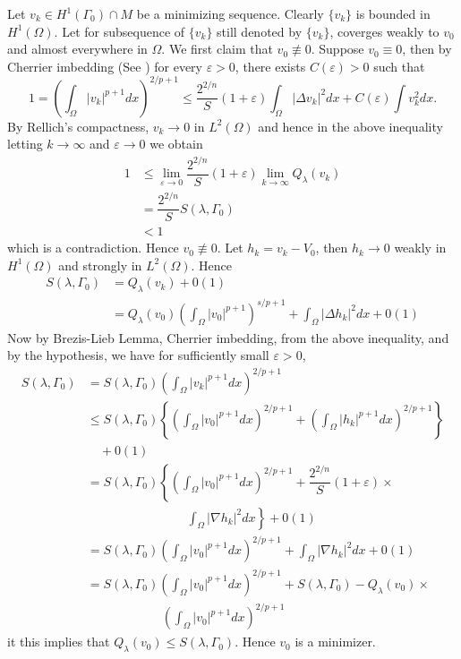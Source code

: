 \begin{sketch of the proof}
\begin{enumerate}[\rm \bf Step 1.]
Let $v_{k} \in H^{1}(\Gamma_{0})\cap M$ be a minimizing sequence. Clearly $\{v_{k}\}$ is bounded in $H^{1}(\Omega)$. Let for subsequence of $\{v_{k}\}$ still denoted by $\{v_{k}\}$, coverges weakly to $v_{0}$ and almost everywhere in $\Omega$. We first claim that $v_{0}\nequiv 0$. Suppose $v_{0}\equiv 0$, then by Cherrier imbedding (See \cite{art2-key8}) for every $\varepsilon > 0$, there exists $C(\varepsilon) > 0$ such that
 $$
 1 = \left(\int_{\Omega}|v_{k}|^{p+1}dx\right)^{2/p+1} \leq \dfrac{2^{2/n}}{S}(1+\varepsilon) \int_{\Omega}|\Delta v_{k}|^{2}dx + C(\varepsilon)\int v_{k}^{2}dx.
$$
By Rellich's compactness, $v_{k} \rightarrow 0$ in $L^{2}(\Omega)$ and hence in the above inequality letting $k \rightarrow \infty$ and $\varepsilon \rightarrow 0$ we obtain
\begin{align*}
1 &\leq \lim_{\varepsilon \rightarrow 0}\dfrac{2^{2/n}}{S}(1+\varepsilon) \lim_{k \rightarrow \infty} Q_{\lambda}(v_{k})\\
&= \dfrac{2^{2/n}}{S}S(\lambda, \Gamma_{0})\\
&< 1
\end{align*}
which is a contradiction. Hence $v_{0}\nequiv 0$. Let $h_{k} = v_{k}-V_{0}$, then $h_{k}\rightarrow 0$ weakly in $H^{1}(\Omega)$ and strongly in $L^{2}(\Omega)$. Hence
\begin{align*}
S(\lambda, \Gamma_{0}) &= Q_{\lambda}(v_{k}) + 0(1)\\
&= Q_{\lambda}(v_{0})\left(\int_{\Omega} |v_{0}|^{p+1}\right)^{s/p+1} + \int_{\Omega} |\Delta h_{k}|^{2}dx + 0(1)
\end{align*}
Now by Brezis-Lieb Lemma, Cherrier imbedding, from the above inequality, and by the hypothesis, we have for sufficiently small $\varepsilon > 0$,
\begin{align*}
S(\lambda, \Gamma_{0}) &= S(\lambda, \Gamma_{0}) \left(\int_{\Omega}|v_{k}|^{p+1}dx\right)^{2/p+1}\\
&\leq S(\lambda, \Gamma_{0}) \left\{\left(\int_{\Omega}|v_{0}|^{p+1}dx\right)^{2/p+1} + \left(\int_{\Omega}|h_{k}|^{p+1}dx\right)^{2/p+1}\right\} \\
&\quad + 0(1)\\
&= S(\lambda, \Gamma_{0}) \left\{\left(\int_{\Omega}|v_{0}|^{p+1}dx\right)^{2/p+1} +\dfrac{2^{2/n}}{S}(1 +              \varepsilon)\times \right. \\
&\qquad\qquad\qquad\qquad \left.\int_{\Omega}|\nabla h_{k}|^{2}dx\right\} + 0(1)\\
&= S(\lambda, \Gamma_{0}) \left(\int_{\Omega}|v_{0}|^{p+1}dx\right)^{2/p+1} + \int_{\Omega}|\nabla h_{k}|^{2}dx + 0(1)\\
&= S(\lambda, \Gamma_{0}) \left(\int_{\Omega}|v_{0}|^{p+1}dx\right)^{2/p+1} + S(\lambda, \Gamma_{0})-Q_{\lambda}(v_{0}) \times \\
&\qquad \qquad \qquad \left(\int_{\Omega}|v_{0}|^{p+1}dx\right)^{2/p+1} 
\end{align*}it
this implies that $Q_{\lambda}(v_{0}) \leq S(\lambda,\Gamma_{0})$. Hence $v_{0}$ is a minimizer.


\end{enumerate}
\end{sketch of the proof}
